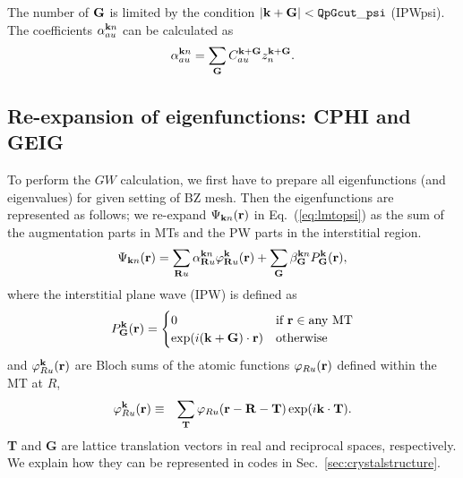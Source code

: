 \documentclass[a4paper,10pt,fleqn]{article}
\def\Psikn{\Psi_{{\bf k}n}}
\def\Psikn{{\Psi_{{\bf k}n}}}
\newcommand{\bfk}{{\bf k}}
\newcommand{\bfr}{{\bf r}}
\newcommand{\bfR}{{\bf R}}
\newcommand{\req}[1]{\mbox{Eq.~(\ref{#1})}}
\begin{document}
The number of ${\bf G}$ is limited by the condition
$|{\bf k+G}|< {\tt QpGcut\_psi}$ (IPWpsi).
The coefficients $\alpha^{{\bf k}n}_{au}$ can be calculated as
\begin{eqnarray}
\alpha^{{\bf k}n}_{au} = \sum_{\bf G} C^{{\bf k+G}}_{a u} z^{\bf k+G}_n.
\end{eqnarray}

\subsection{Re-expansion of eigenfunctions: CPHI and GEIG}
To perform the $GW$ calculation, we first
have to prepare all eigenfunctions (and eigenvalues) for
given setting of BZ mesh. Then the eigenfunctions are
represented as follows; we
re-expand $\Psikn(\bfr)$ in \req{eq:lmtopsi}  
as the sum of the augmentation parts in MTs and the
PW parts in the interstitial region.
\begin{eqnarray}
\Psikn(\bfr)
= \sum_{\bfR u}  \alpha^{{\bfk}n}_{\bfR u} \varphi^{\bf k}_{\bfR u}({\bf r})
 + \sum_{\bf G}  \beta^{{\bfk}n}_{\bf G} P^{\bf k}_{\bf G}({\bf r}),
\label{def:psiexp}
\end{eqnarray}
where the interstitial plane wave (IPW) is defined as
\begin{eqnarray}
P^{\bf k}_{\bf G}({\bf r}) =
\begin{cases}
0    & \text{if {\bf r}} \in \text{any MT} \\
\exp(i ({\bf k+G})\cdot{\bf r})& \text{otherwise}
\end{cases}
\label{eq:defpg}
\end{eqnarray}
and $\varphi^{\bf k}_{R u}(\bfr)$ are Bloch sums of the atomic functions
$\varphi_{R u}(\bfr)$ defined within the MT at $R$,
\begin{eqnarray}
\varphi^{\bf k}_{R u}({\bf r}) &\equiv& \sum_{\bf T} \varphi_{R u}({\bf r-R-T}) \exp(i {\bf k\cdot{}T}).
\end{eqnarray}
{\bf T} and {\bf G} are lattice translation vectors in real and reciprocal spaces, respectively. 
We explain how they can be represented in codes
in Sec.~\ref{sec:crystalstructure}.
\end{document}
